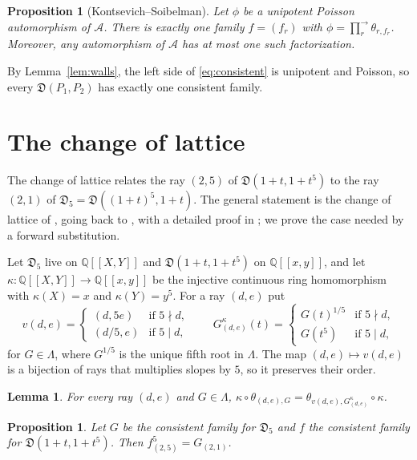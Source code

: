 \documentclass[11pt]{article}
\newtheorem{lemma}[theorem]{Lemma}
\newtheorem{proposition}[theorem]{Proposition}
\theoremstyle{definition}
\theoremstyle{remark}
\numberwithin{equation}{section}
\newcommand{\Q}{\mathbb{Q}}
\newcommand{\ps}[1]{\Q[\![#1]\!]}
\newcommand{\asc}{\textstyle\prod^{\rightarrow}}
\begin{document}
\begin{proposition}[Kontsevich--Soibelman]\label{prop:KS}
Let $\phi$ be a unipotent Poisson automorphism of $\mathcal{A}$. There is
exactly one family $f=(f_r)$ with $\phi=\asc_r\theta_{r,f_r}$. Moreover,
any automorphism of $\mathcal{A}$ has at most one such factorization.
\end{proposition}



By Lemma~\ref{lem:walls}, the left side of \eqref{eq:consistent} is
unipotent and Poisson, so every $\mathfrak{D}(P_1,P_2)$ has exactly one
consistent family.

\section{The change of lattice}\label{sec:lattice}

The change of lattice relates the ray $(2,5)$ of $\mathfrak{D}(1+t,1+t^5)$ to the
ray $(2,1)$ of $\mathfrak{D}_5=\mathfrak{D}((1+t)^5,1+t)$. The general
statement is the change of lattice of \cite[Proposition~2.5]{BLMMR},
going back to \cite[Example~1.15 and Appendix~C]{GHKK}, with a detailed
proof in \cite[Proposition~1.12]{GL}; we prove the case needed by a
forward substitution.

Let $\mathfrak{D}_5$ live on $\ps{X,Y}$ and $\mathfrak{D}(1+t,1+t^5)$ on
$\ps{x,y}$, and let $\kappa\colon\ps{X,Y}\to\ps{x,y}$ be the injective
continuous ring homomorphism with $\kappa(X)=x$ and $\kappa(Y)=y^5$. For a
ray $(d,e)$ put
\[
  v(d,e)=\begin{cases}(d,5e)&\text{if }5\nmid d,\\ (d/5,e)&\text{if }5\mid d,\end{cases}
  \qquad
  G^{\kappa}_{(d,e)}(t)=\begin{cases}G(t)^{1/5}&\text{if }5\nmid d,\\ G(t^5)&\text{if }5\mid d,\end{cases}
\]
for $G\in\Lambda$, where $G^{1/5}$ is the unique fifth root in $\Lambda$.
The map $(d,e)\mapsto v(d,e)$ is a bijection of rays that multiplies
slopes by $5$, so it preserves their order.

\begin{lemma}\label{lem:kappa}
For every ray $(d,e)$ and $G\in\Lambda$,
$\kappa\circ\theta_{(d,e),G}=\theta_{v(d,e),G^{\kappa}_{(d,e)}}\circ\kappa$.
\end{lemma}



\begin{proposition}\label{prop:lattice}
Let $G$ be the consistent family for $\mathfrak{D}_5$ and $f$ the
consistent family for $\mathfrak{D}(1+t,1+t^5)$. Then
$f_{(2,5)}^5=G_{(2,1)}$.
\end{proposition}
\end{document}
